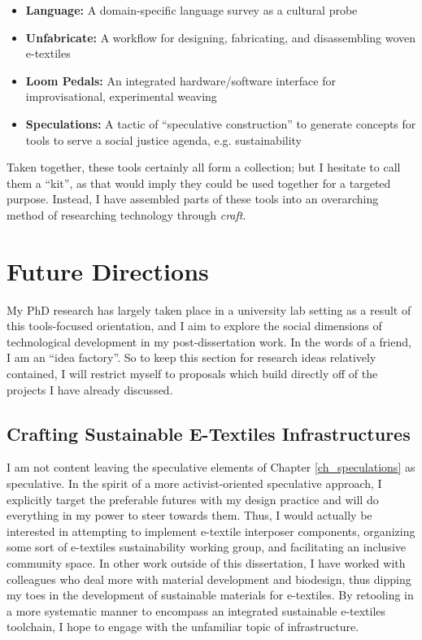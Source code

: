 \begin{itemize}
  \item \textbf{Language:} A domain-specific language survey as a cultural probe 
  \item \textbf{Unfabricate:} A workflow for designing, fabricating, and disassembling woven e-textiles 
  \item \textbf{Loom Pedals:} An integrated hardware/software interface for improvisational, experimental weaving
  \item \textbf{Speculations:} A tactic of ``speculative construction'' to generate concepts for tools to serve a social justice agenda, e.g. sustainability
\end{itemize}

Taken together, these tools certainly all form a collection; but I hesitate to call them a ``kit'', as that would imply they could be used together for a targeted purpose. Instead, I have assembled parts of these tools into an overarching method of researching technology through \textit{craft}. 

\section{Future Directions}

My PhD research has largely taken place in a university lab setting as a result of this tools-focused orientation, and I aim to explore the social dimensions of technological development in my post-dissertation work.
In the words of a friend, I am an ``idea factory''. So to keep this section for research ideas relatively contained, I will restrict myself to proposals which build directly off of the projects I have already discussed.

\subsection{Crafting Sustainable E-Textiles Infrastructures}

I am not content leaving the speculative elements of Chapter \ref{ch_speculations} as speculative. In the spirit of a more activist-oriented speculative approach, I explicitly target the preferable futures with my design practice and will do everything in my power to steer towards them. Thus, I would actually be interested in attempting to implement e-textile interposer components, organizing some sort of e-textiles sustainability working group, and facilitating an inclusive community space. In other work outside of this dissertation, I have worked with colleagues who deal more with material development and biodesign, thus dipping my toes in the development of sustainable materials for e-textiles. 
By retooling in a more systematic manner to encompass an integrated sustainable e-textiles toolchain, I hope to engage with the unfamiliar topic of infrastructure.

